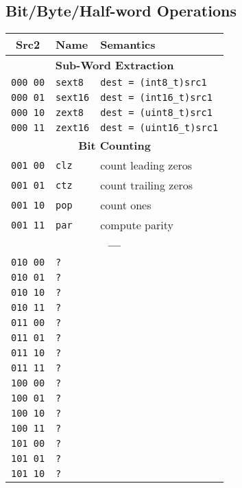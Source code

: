 \documentclass[10pt,DIV12]{scrartcl}
\begin{document}
\pagebreak
\subsection{Bit/Byte/Half-word Operations}
\label{sec:mask}

\begin{tabular}{cll}
\toprule
Src2 & Name & Semantics \\
\midrule
\multicolumn{3}{c}{\textsf{\textbf{Sub-Word Extraction}}} \\
\cmidrule{1-3}
\texttt{000 00} & \texttt{sext8}  & \texttt{dest = (int8\_t)src1} \\
\texttt{000 01} & \texttt{sext16} & \texttt{dest = (int16\_t)src1} \\
\texttt{000 10} & \texttt{zext8}  & \texttt{dest = (uint8\_t)src1} \\
\texttt{000 11} & \texttt{zext16} & \texttt{dest = (uint16\_t)src1} \\
\midrule
\multicolumn{3}{c}{\textsf{\textbf{Bit Counting}}} \\
\cmidrule{1-3}
\texttt{001 00} & \texttt{clz} & count leading zeros \\
\texttt{001 01} & \texttt{ctz} & count trailing zeros \\
\texttt{001 10} & \texttt{pop} & count ones \\
\texttt{001 11} & \texttt{par} & compute parity \\
\midrule
\multicolumn{3}{c}{\textbf{---}} \\
\cmidrule{1-3}
\texttt{010 00} & \texttt{?} & \\
\texttt{010 01} & \texttt{?} & \\
\texttt{010 10} & \texttt{?} & \\
\texttt{010 11} & \texttt{?} & \\
\texttt{011 00} & \texttt{?} & \\
\texttt{011 01} & \texttt{?} & \\
\texttt{011 10} & \texttt{?} & \\
\texttt{011 11} & \texttt{?} & \\
\texttt{100 00} & \texttt{?} & \\
\texttt{100 01} & \texttt{?} & \\
\texttt{100 10} & \texttt{?} & \\
\texttt{100 11} & \texttt{?} & \\
\texttt{101 00} & \texttt{?} & \\
\texttt{101 01} & \texttt{?} & \\
\texttt{101 10} & \texttt{?} & \\

\end{tabular}
\end{document}
